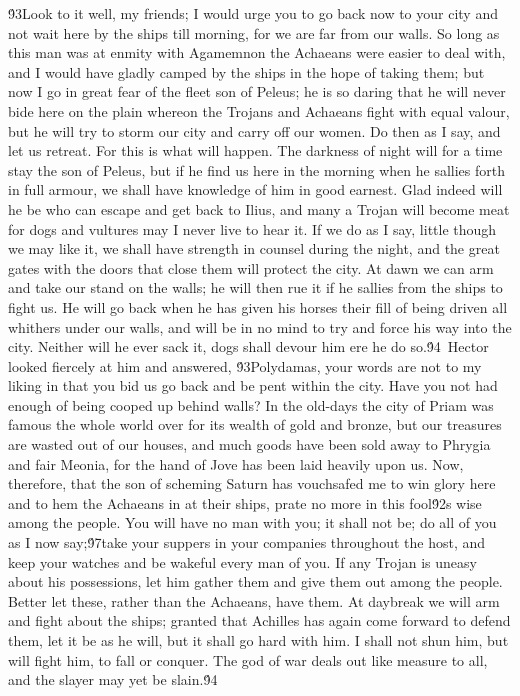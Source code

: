{\'93Look to it well, my friends; I would urge you to go back now to your city and not wait here by the ships till morning, for we are far from our walls. So long as this man was at enmity with Agamemnon the Achaeans were easier to deal with, and I would have gladly camped by the ships in the hope of taking them; but now I go in great fear of the fleet son of Peleus; he is so daring that he will never bide here on the plain whereon the Trojans and Achaeans fight with equal valour, but he will try to storm our city and carry off our women. Do then as I say, and let us retreat. For this is what will happen. The darkness of night will for a time stay the son of Peleus, but if he find us here in the morning when he sallies forth in full armour, we shall have knowledge of him in good earnest. Glad indeed will he be who can escape and get back to Ilius, and many a Trojan will become meat for dogs and vultures may I never live to hear it. If we do as I say, little though we may like it, we shall have strength in counsel during the night, and the great gates with the doors that close them will protect the city. At dawn we can arm and take our stand on the walls; he will then rue it if he sallies from the ships to fight us. He will go back when he has given his horses their fill of being driven all whithers under our walls, and will be in no mind to try and force his way into the city. Neither will he ever sack it, dogs shall devour him ere he do so.\'94\
Hector looked fiercely at him and answered, \'93Polydamas, your words are not to my liking in that you bid us go back and be pent within the city. Have you not had enough of being cooped up behind walls? In the old-days the city of Priam was famous the whole world over for its wealth of gold and bronze, but our treasures are wasted out of our houses, and much goods have been sold away to Phrygia and fair Meonia, for the hand of Jove has been laid heavily upon us. Now, therefore, that the son of scheming Saturn has vouchsafed me to win glory here and to hem the Achaeans in at their ships, prate no more in this fool\'92s wise among the people. You will have no man with you; it shall not be; do all of you as I now say;\'97take your suppers in your companies throughout the host, and keep your watches and be wakeful every man of you. If any Trojan is uneasy about his possessions, let him gather them and give them out among the people. Better let these, rather than the Achaeans, have them. At daybreak we will arm and fight about the ships; granted that Achilles has again come forward to defend them, let it be as he will, but it shall go hard with him. I shall not shun him, but will fight him, to fall or conquer. The god of war deals out like measure to all, and the slayer may yet be slain.\'94\
}
